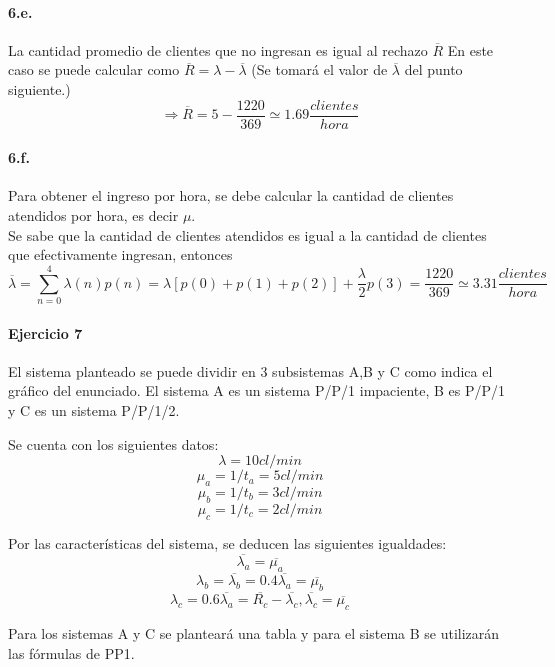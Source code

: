 \documentclass{article}
\begin{document}
    
    \paragraph{6.e.} La cantidad promedio de clientes que no ingresan es igual al rechazo  $ \overline{R}$
    En este caso se puede calcular como $ \overline{R} = \lambda - \overline{\lambda}$ (Se tomará el valor de $\overline{\lambda}$ del punto siguiente.)
    $$ \Rightarrow \overline{R} = 5 - \frac{1220}{369} \simeq 1.69 \frac{clientes}{hora}$$
    
    
    \paragraph{6.f.} Para obtener el ingreso por hora, se debe calcular la cantidad de clientes atendidos por hora, es decir $\mu$.\\
    Se sabe que la cantidad de clientes atendidos es igual a la cantidad de clientes que efectivamente ingresan, entonces \\
    $$ \overline{\lambda} = \sum_{n=0}^{4}\lambda(n) p(n) = \lambda [ p(0)+p(1)+p(2) ] + \frac{\lambda}{2} p(3) = \frac{1220}{369} \simeq 3.31 \frac{clientes}{hora}$$
 

\paragraph{Ejercicio 7}
  El sistema planteado se puede dividir en 3 subsistemas A,B y C como indica el gráfico del enunciado. 
  El sistema A es un sistema P/P/1 impaciente, B es P/P/1 y C es un sistema P/P/1/2.
  
  Se cuenta con los siguientes datos: \\
  $$ \lambda = 10 cl/min $$
  $$ \mu_a = 1/t_a = 5 cl/min $$
  $$ \mu_b = 1/t_b = 3 cl/min $$
  $$ \mu_c = 1/t_c = 2 cl/min $$
 
  Por las características del sistema, se deducen las siguientes igualdades: \\
  $$ \overline{\lambda_a} = \overline{\mu_a}$$
  $$ \lambda_b = \overline{\lambda_b} = 0.4 \overline{\lambda_a} = \overline{\mu_b}$$
  $$ \lambda_c = 0.6 \overline{\lambda_a} = \overline{R_c} - \overline{\lambda_c} , \overline{\lambda_c} = \overline{\mu_c}$$
  
 Para los sistemas A y C se planteará una tabla y para el sistema B se utilizarán las fórmulas de PP1. \\ \\
\end{document}
